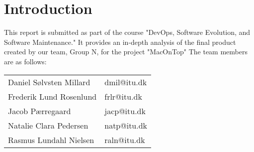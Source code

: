 \newpage
\section{Introduction}

This report is submitted as part of the course "DevOps, Software Evolution, and Software Maintenance." It provides an in-depth analysis of the final product created by our team, Group N, for the project "MacOnTop" The team members are as follows:
\newline \newline
\begin{center}
\begin{tabular}{ll}
    Daniel Sølvsten Millard & dmil@itu.dk \\
    Frederik Lund Rosenlund & frlr@itu.dk \\
    Jacob Pærregaard & jacp@itu.dk \\
    Natalie Clara Pedersen & natp@itu.dk \\
    Rasmus Lundahl Nielsen & raln@itu.dk \\
\end{tabular}

\end{center}
